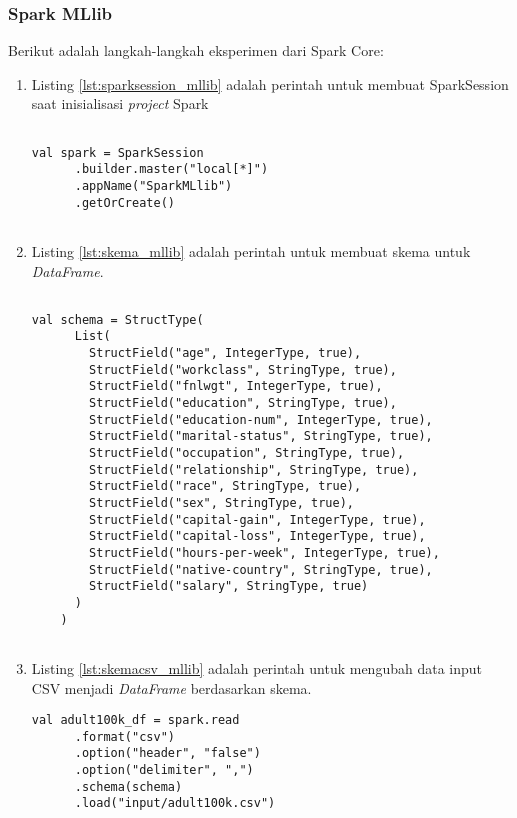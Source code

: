 \subsubsection{Spark MLlib}
\noindent Berikut adalah langkah-langkah eksperimen dari Spark Core:
\begin{enumerate}

\item Listing \ref{lst:sparksession_mllib} adalah perintah untuk membuat SparkSession saat inisialisasi \textit{project} Spark
\begin{lstlisting}[basicstyle=\ttfamily, frame=single,
	columns=fullflexible, keepspaces=true, breaklines=true, label=lst:sparksession_mllib, caption=Membuat Perintah SparkSession]
	
val spark = SparkSession
      .builder.master("local[*]")
      .appName("SparkMLlib")
      .getOrCreate()
	
\end{lstlisting}

\item Listing \ref{lst:skema_mllib} adalah perintah untuk membuat skema untuk \textit{DataFrame}. 
\begin{lstlisting}[basicstyle=\ttfamily, frame=single,
	columns=fullflexible, keepspaces=true, breaklines=true, label=lst:skema_mllib, caption=Membuat Skema Dataframe]
	
val schema = StructType(
      List(
        StructField("age", IntegerType, true),
        StructField("workclass", StringType, true),
        StructField("fnlwgt", IntegerType, true),
        StructField("education", StringType, true),
        StructField("education-num", IntegerType, true),
        StructField("marital-status", StringType, true),
        StructField("occupation", StringType, true),
        StructField("relationship", StringType, true),
        StructField("race", StringType, true),
        StructField("sex", StringType, true),
        StructField("capital-gain", IntegerType, true),
        StructField("capital-loss", IntegerType, true),
        StructField("hours-per-week", IntegerType, true),
        StructField("native-country", StringType, true),
        StructField("salary", StringType, true)
      )
    )
    	
\end{lstlisting}

\item Listing \ref{lst:skemacsv_mllib} adalah perintah untuk mengubah data input CSV menjadi \textit{DataFrame} berdasarkan skema.
\begin{lstlisting}[basicstyle=\ttfamily, frame=single,
	columns=fullflexible, keepspaces=true, breaklines=true, label=lst:skemacsv_mllib, caption=Mengubah CSV Menjadi Dataframe]
val adult100k_df = spark.read
      .format("csv")
      .option("header", "false")
      .option("delimiter", ",")
      .schema(schema)
      .load("input/adult100k.csv")


\end{lstlisting}
\end{enumerate}
